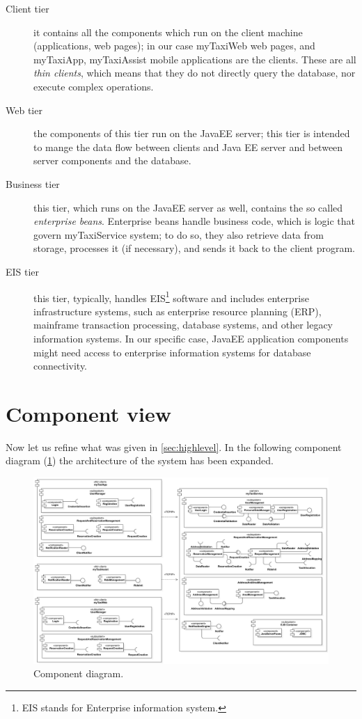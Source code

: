 \begin{description}
	\item [Client tier] it contains all the components which run on the client machine (applications, web pages); in our case myTaxiWeb web pages, and myTaxiApp, myTaxiAssist mobile applications are the clients. These are all \emph{thin clients}, which means that they do not directly query the database, nor execute complex operations. 
	
	\item [Web tier] the components of this tier run on the JavaEE server; this tier is intended to mange the data flow between clients and Java EE server and between server components and the database.

	\item [Business tier] this tier, which runs on the JavaEE server as well, contains the so called \emph{enterprise beans}. Enterprise beans handle business code, which is logic that govern myTaxiService system; to do so, they also retrieve data from storage, processes it (if necessary), and sends it back to the client program.

	\item [EIS tier] this tier, typically, handles EIS\footnote{EIS stands for Enterprise information system.} software and includes enterprise infrastructure systems, such as enterprise resource planning (ERP), mainframe transaction processing, database systems, and other legacy information systems. In our specific case, JavaEE application components might need access to enterprise information systems for database connectivity.
	
\end{description}


\section{Component view}\label{sec:componentView}
Now let us refine what was given in \cref{sec:highlevel}. In the following component diagram (\cref{fig:component}) the architecture of the system has been expanded.

\begin{figure}%
	\centering%
	\includegraphics[width=\linewidth]{img/ComponentView__ComponentDiagram_1}%
	\caption{Component diagram.}\label{fig:component}%
\end{figure}

